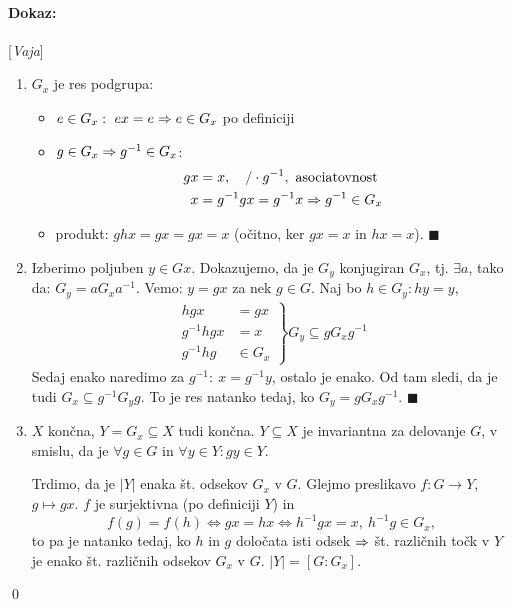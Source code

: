 \paragraph{Dokaz:}[\emph{Vaja}]
\begin{enumerate}
	\item{$G_x$ je res podgrupa:
		\begin{itemize}
			\item{$e \in G_x:\ ex = e \Rightarrow e \in G_x$ po definiciji}
			\item{$g \in G_x \Rightarrow g^{-1} \in G_x$:
				\begin{align*}
					gx &= x,\quad /\cdot g^{-1},\ \text{asociatovnost} \\
					x &= g^{-1}g x = g^{-1} x \then g^{-1} \in G_x \\
				\end{align*}}
			\item{produkt: $ghx = gx = gx = x$ (o\v citno, ker $gx = x$ in $hx = x$). $\blacksquare$}
		\end{itemize}}
	\item{Izberimo poljuben $y \in Gx$. Dokazujemo, da je $G_y$ konjugiran $G_x$, tj. $\exists a$, tako da: $G_y = a G_x a^{-1}$.
		Vemo: $y = gx$ za nek $g \in G$. Naj bo $h \in G_y: hy = y$,
		\begin{align*}
			\left.
			\begin{array}{rl}
			hgx &= gx\\
			g^{-1} hgx &= x\\
			g^{-1} h g &\in G_x
			\end{array} \right\} G_y \subseteq g G_x g^{-1}
		\end{align*}}
		Sedaj enako naredimo za $g^{-1}:\ x = g^{-1} y$, ostalo je enako. Od tam sledi, da je tudi $G_x \subseteq g^{-1} G_y g$.
		To je res natanko tedaj, ko $G_y = gG_x g^{-1}$. $\blacksquare$
	\item{$X$ kon\v cna, $Y = G_x \subseteq X$ tudi kon\v cna. $Y \subseteq X$ je invariantna za delovanje $G$, v smislu, da je
		$\forall g \in G$ in $\forall y \in Y: gy \in Y$.

		\ni Trdimo, da je $|Y|$ enaka \v st. odsekov $G_x$ v $G$. Glejmo preslikavo $f : G \to Y$, $g \mapsto gx$. $f$ je surjektivna  (po definiciji $Y$) in
		\[
			f(g) = f(h) \iff gx = hx \iff h^{-1}gx = x,\ h^{-1}g \in G_x,
		\] to pa je natanko tedaj, ko $h$ in $g$ dolo\v cata isti odsek $\Rightarrow$ \v st. razli\v cnih to\v ck v $Y$ je enako \v st. razli\v cnih odsekov $G_x$
		v $G$. $|Y| = [G:G_x]$.}
\end{enumerate}
\qed

